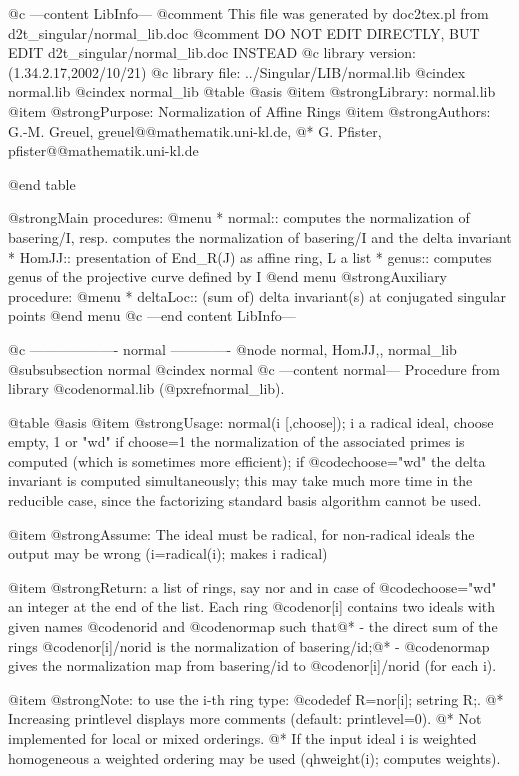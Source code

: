 @c ---content LibInfo---
@comment This file was generated by doc2tex.pl from d2t_singular/normal_lib.doc
@comment DO NOT EDIT DIRECTLY, BUT EDIT d2t_singular/normal_lib.doc INSTEAD
@c library version: (1.34.2.17,2002/10/21)
@c library file: ../Singular/LIB/normal.lib
@cindex normal.lib
@cindex normal_lib
@table @asis
@item @strong{Library:}
normal.lib
@item @strong{Purpose:}
     Normalization of Affine Rings
@item @strong{Authors:}
G.-M. Greuel, greuel@@mathematik.uni-kl.de,
@* G. Pfister, pfister@@mathematik.uni-kl.de

@end table

@strong{Main procedures:}
@menu
* normal:: computes the normalization of basering/I, resp. computes the normalization of basering/I and the delta invariant
* HomJJ:: presentation of End_R(J) as affine ring, L a list
* genus:: computes genus of the projective curve defined by I
@end menu
@strong{Auxiliary procedure:}
@menu
* deltaLoc:: (sum of) delta invariant(s) at conjugated singular points
@end menu
@c ---end content LibInfo---

@c ------------------- normal -------------
@node normal, HomJJ,, normal_lib
@subsubsection normal
@cindex normal
@c ---content normal---
Procedure from library @code{normal.lib} (@pxref{normal_lib}).

@table @asis
@item @strong{Usage:}
normal(i [,choose]); i a radical ideal, choose empty, 1 or "wd"
if choose=1 the normalization of the associated primes is computed
(which is sometimes more efficient);
if @code{choose="wd"} the delta invariant is computed
simultaneously; this may take much more time in the reducible case,
since the factorizing standard basis algorithm cannot be used.

@item @strong{Assume:}
The ideal must be radical, for non-radical ideals the output may
be wrong (i=radical(i); makes i radical)

@item @strong{Return:}
a list of rings, say nor and in case of @code{choose="wd"} an
integer at the end of the list.
Each ring @code{nor[i]} contains two ideals with given names
@code{norid} and @code{normap} such that@*
- the direct sum of the rings @code{nor[i]/norid} is the
normalization of basering/id;@*
- @code{normap} gives the normalization map from basering/id to
@code{nor[i]/norid} (for each i).

@item @strong{Note:}
to use the i-th ring type: @code{def R=nor[i]; setring R;}.
@* Increasing printlevel displays more comments (default: printlevel=0).
@* Not implemented for local or mixed orderings.
@* If the input ideal i is weighted homogeneous a weighted ordering may
be used (qhweight(i); computes weights).

